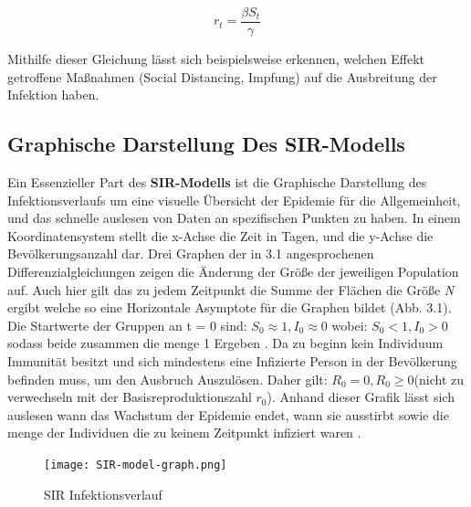 \documentclass[12pt]{scrartcl} %
\begin{document}
$$ r_{t} = \frac{\beta S_{t}}{\gamma} $$

Mithilfe dieser Gleichung lässt sich beispielsweise erkennen, welchen Effekt getroffene Maßnahmen (Social Distancing, Impfung) auf die Ausbreitung der Infektion haben.


\subsection{Graphische Darstellung Des SIR-Modells}

Ein Essenzieller Part des \textbf{SIR-Modells} ist die Graphische Darstellung des Infektionsverlaufs um eine visuelle Übersicht der Epidemie für die Allgemeinheit, und das schnelle auslesen von Daten an spezifischen Punkten zu haben.
In einem Koordinatensystem stellt die x-Achse die Zeit in Tagen, und die y-Achse die Bevölkerungsanzahl dar. Drei Graphen der in 3.1 angesprochenen Differenzialgleichungen zeigen die Änderung der Größe der jeweiligen Population auf.
Auch hier gilt das zu jedem Zeitpunkt die Summe der Flächen die Größe \textit{N} ergibt welche so eine Horizontale Asymptote für die Graphen bildet (Abb. 3.1).
Die Startwerte der Gruppen an t = 0 sind: 
$S_{0} \approx 1, I_{0} \approx 0$ wobei: $ S_{0} < 1, I_{0} > 0$ sodass beide zusammen die menge 1 Ergeben \cite{4}.
Da zu beginn kein Individuum Immunität besitzt und sich mindestens eine Infizierte Person in der Bevölkerung befinden muss, um den Ausbruch Auszulösen. Daher gilt: $R_{0} = 0, R_{0} \geq 0 $(nicht zu verwechseln mit der Basisreproduktionszahl $r_{0}$).
Anhand dieser Grafik lässt sich auslesen wann das Wachstum der Epidemie endet, wann sie ausstirbt sowie die menge der Individuen die zu keinem Zeitpunkt infiziert waren \cite{1}.

	\begin{figure}[h]
	\centering
	\texttt{[image: SIR-model-graph.png]}
	\caption[SIR Infektionsverlauf,\newline https://www.davidketcheson.info/2020/03/17/SIR\textunderscore model.html]{SIR Infektionsverlauf}
	\end{figure}


\end{document}
